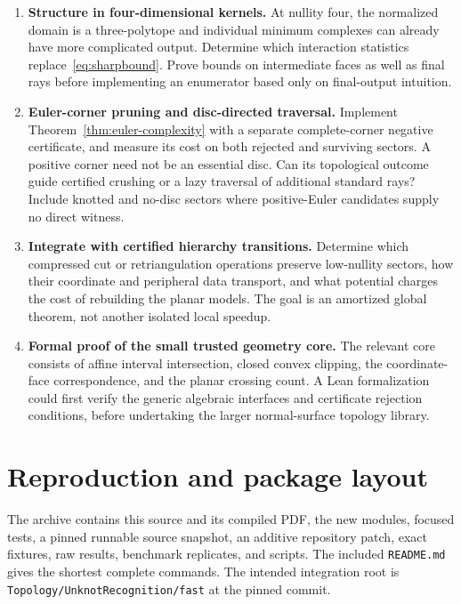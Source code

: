 \documentclass[11pt,letterpaper]{article}
\theoremstyle{definition}
\theoremstyle{remark}\newtheorem{remark}[theorem]{Remark}
\newcommand{\code}[1]{\nolinkurl{#1}}
\begin{document}
\begin{enumerate}[label=\textbf{\arabic*.},leftmargin=*]
\item \textbf{Structure in four-dimensional kernels.}
At nullity four, the normalized domain is a three-polytope and individual
minimum complexes can already have more complicated output. Determine
which interaction statistics replace~\eqref{eq:sharpbound}. Prove bounds
on intermediate faces as well as final rays before implementing an
enumerator based only on final-output intuition.

\item \textbf{Euler-corner pruning and disc-directed traversal.}
Implement Theorem~\ref{thm:euler-complexity} with a separate complete-corner
negative certificate, and measure its cost on both rejected and surviving
sectors. A positive corner need not be an essential disc. Can its
topological outcome guide certified crushing or a lazy traversal of
additional standard rays? Include knotted and no-disc sectors where
positive-Euler candidates supply no direct witness.

\item \textbf{Integrate with certified hierarchy transitions.}
Determine which compressed cut or retriangulation operations preserve
low-nullity sectors, how their coordinate and peripheral data transport,
and what potential charges the cost of rebuilding the planar models.
The goal is an amortized global theorem, not another isolated local
speedup.

\item \textbf{Formal proof of the small trusted geometry core.}
The relevant core consists of affine interval intersection, closed convex
clipping, the coordinate-face correspondence, and the planar crossing
count. A Lean formalization could first verify the generic algebraic
interfaces and certificate rejection conditions, before undertaking the
larger normal-surface topology library.
\end{enumerate}

\appendix
\clearpage
\section{Reproduction and package layout}
\label{app:reproduce}

The archive contains this source and its compiled PDF, the new modules,
focused tests, a pinned runnable source snapshot, an additive repository
patch, exact fixtures, raw results, benchmark replicates, and scripts.
The included \code{README.md} gives the shortest complete commands.
The intended integration root is
\code{Topology/UnknotRecognition/fast} at the pinned commit.
\end{document}
